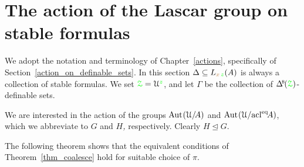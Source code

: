 \section{The action of the Lascar group on stable formulas}\label{Lascar_action}

\def\medrel#1{\parbox[t]{6ex}{$\displaystyle\hfil #1$}}
\def\ceq#1#2#3{\parbox[t]{13ex}{$\displaystyle #1$}\medrel{#2}{$\displaystyle #3$}}

\def\DLascar{L\kern-.6ex\raisebox{1.1ex}{\tiny$\Delta$}\kern-.1ex ascar}


We adopt the notation and terminology of Chapter~\ref{actions}, specifically of Section~\ref{action_on_definable_sets}.
In this section $\Delta\subseteq L_{{\color{brown} x}\,{\color{green} z}}(A)$ is always a collection of stable formulas.
We set ${\color{green}\EuScript Z}=\EuScript U^{\color{green} z}$, and let $\Gamma$ be the collection of $\BDelta(\grZ)$-definable sets.

We are interested in the action of the groups ${\rm Aut\kern.15ex}(\EuScript U/\!A)$ and ${\rm Aut\kern.15ex}(\EuScript U/{\rm acl}^{{\rm eq}}\!A)$, which we abbreviate to \emph{$G$} and \emph{$H$,} respectively.
Clearly $H\trianglelefteq G$.




The following theorem shows that the equivalent conditions of Theorem~\ref{thm_coalesce} hold for suitable choice of $\pi$.

